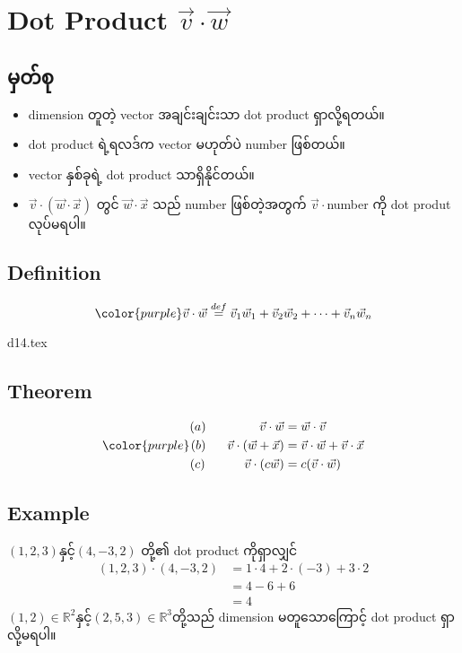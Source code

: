 \section{Dot Product $\vec{v}\cdot\vec{w}$}
\subsection{မှတ်စု}
\begin{itemize}
    \item dimension တူတဲ့ vector အချင်းချင်းသာ dot product ရှာလို့ရတယ်။
    \item dot product ရဲ့ရလဒ်က vector မဟုတ်ပဲ number ဖြစ်တယ်။
    \item vector နှစ်ခုရဲ့ dot product သာရှိနိုင်တယ်။
    \item $\vec{v}\cdot(\vec{w}\cdot\vec{x})$ တွင် $\vec{w}\cdot\vec{x}$ သည် number ဖြစ်တဲ့အတွက် $\vec{v}\cdot$number ကို dot produt လုပ်မရပါ။
\end{itemize}
\subsection{Definition}
\begin{equation}
    {\color{purple} \vec{v}\cdot\vec{w}\stackrel{def}{=}\vec{v}_1\vec{w}_1+\vec{v}_2\vec{w}_2+\dots+\vec{v}_n\vec{w}_n}
    \label{eq:dot-product}
\end{equation}
\begin{center}
    {d14.tex}
\end{center}
\subsection{Theorem}
\begin{equation}
    {\color{purple} \begin{split}
            (a)\hspace{15mm}\vec{v}\cdot\vec{w}          & =\vec{w}\cdot\vec{v}                     \\
            (b)\hspace{6mm}\vec{v}\cdot(\vec{w}+\vec{x}) & =\vec{v}\cdot\vec{w}+\vec{v}\cdot\vec{x} \\
            (c)\hspace{11mm}\vec{v}\cdot(c\vec{w})       & =c(\vec{v}\cdot\vec{w})
        \end{split}}
    \label{eq:dot-product-theorem}
\end{equation}
\subsection{Example}
$(1,2,3)$နှင့်$(4,-3,2)$ တို့၏ dot product ကိုရှာလျှင်
\[
    \begin{split}
        (1,2,3)\cdot(4,-3,2) & =1\cdot4+2\cdot(-3)+3\cdot2 \\
                             & =4-6+6                      \\
                             & =4
    \end{split}
\]
$(1,2)\in\mathbb{R}^2$နှင့်$(2,5,3)\in\mathbb{R}^3$တို့သည် dimension မတူသောကြောင့် dot product ရှာလို့မရပါ။